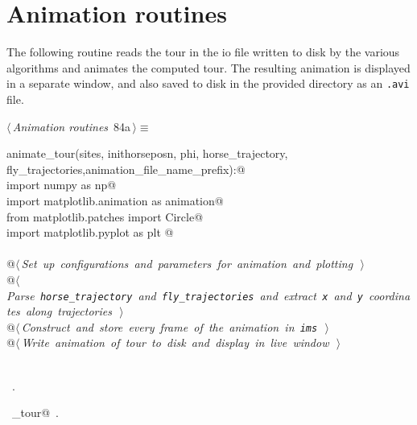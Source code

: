 \documentclass[11.5pt]{report}
\begin{document}
\section{Animation routines}
\newchunk The following routine reads the tour in the io file written to disk by the various
algorithms and animates the computed tour. The resulting animation is displayed in a separate 
window, and also saved to disk in the provided directory as an \verb|.avi| file. 
\begin{flushleft} \small
\begin{minipage}{\linewidth}\label{scrap134}\raggedright\small
{} $\langle\,${\itshape Animation routines}\nobreak\ {\footnotesize {84a}}$\,\rangle\equiv$
\vspace{-1ex}
\begin{list}{}{} \item
\mbox{}\verb@def animate_tour(sites, inithorseposn, phi, horse_trajectory, fly_trajectories,animation_file_name_prefix):@\\
\mbox{}\verb@     import numpy as np@\\
\mbox{}\verb@     import matplotlib.animation as animation@\\
\mbox{}\verb@     from   matplotlib.patches import Circle@\\
\mbox{}\verb@     import matplotlib.pyplot as plt @\\
\mbox{}\verb@@\\
\mbox{}\verb@     @\hbox{$\langle\,${\itshape Set up configurations and parameters for animation and plotting}\nobreak\ {\footnotesize {}}$\,\rangle$}\verb@@\\
\mbox{}\verb@     @\hbox{$\langle\,${\itshape Parse \verb|horse_trajectory| and \verb|fly_trajectories| and extract \verb|x| and \verb|y| coordinates along trajectories}\nobreak\ {\footnotesize {}}$\,\rangle$}\verb@@\\
\mbox{}\verb@     @\hbox{$\langle\,${\itshape Construct and store every frame of the animation in \verb|ims|}\nobreak\ {\footnotesize {}}$\,\rangle$}\verb@@\\
\mbox{}\verb@     @\hbox{$\langle\,${\itshape Write animation of tour to disk and display in live window}\nobreak\ {\footnotesize {}}$\,\rangle$}\verb@@\\
\mbox{}\verb@@\\
\mbox{}\verb@@{\NWsep}
\end{list}
\vspace{-1.5ex}
\footnotesize
\begin{list}{}{\setlength{\itemsep}{-\parsep}\setlength{\itemindent}{-\leftmargin}}
\item \NWtxtMacroRefIn\ .
\item \NWtxtIdentsDefed\nobreak\  \verb@animate_tour@\nobreak\ .
\item{}
\end{list}
\end{minipage}\vspace{4ex}
\end{flushleft}
\end{document}
